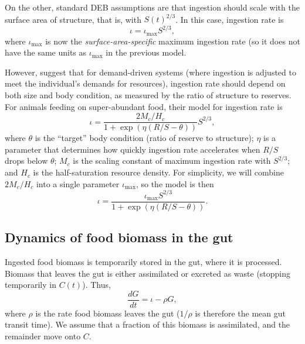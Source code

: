 \documentclass[11pt,reqno,final,pdftex]{amsart}\usepackage[]{graphicx}\usepackage[]{color}
\theoremstyle{plain}
\numberwithin{equation}{part}
\begin{document}
On the other, standard DEB assumptions are that ingestion should scale with the surface area of structure, that is, with $S(t)^{2/3}$.
In this case, ingestion rate is
\begin{equation}
\iota=\iota_{\max }S^{2/3},
\end{equation}
where $\iota_{\max}$ is now the \emph{surface-area-specific} maximum ingestion rate (so it does not have the same units as $\iota_{\max}$ in the previous model.

However, \citet{deRoos2013} suggest that for demand-driven systems (where ingestion is adjusted to meet the individual's demands for resources), ingestion rate should depend on both size and body condition, as measured by the ratio of structure to reserves.
For animals feeding on super-abundant food, their model for ingestion rate is
\begin{equation}
\iota = \frac{2M_c/H_c}{1 + \exp\left(\eta(R/S-\theta)\right)}S^{2/3},
\end{equation}
where $\theta$ is the ``target'' body condition (ratio of reserve to structure); $\eta$ is a parameter that determines how quickly ingestion rate accelerates when $R/S$ drops below $\theta$; $M_c$ is the scaling constant of maximum ingestion rate with $S^{2/3}$; and $H_c$ is the half-saturation resource density.
For simplicity, we will combine $2M_c/H_c$ into a single parameter $\iota_{\max}$, so the model is then
\begin{equation}
\iota = \frac{\iota_{\max}S^{2/3}}{1 + \exp\left(\eta(R/S-\theta)\right)}.
\end{equation}


\subsection*{Dynamics of food biomass in the gut}
Ingested food biomass is temporarily stored in the gut, where it is processed.
Biomass that leaves the gut is either assimilated or excreted as waste (stopping temporarily in $C(t)$).
Thus,
\begin{equation}
\frac{dG}{dt} = \iota - \rho G,
\end{equation}
where $\rho$ is the rate food biomass leaves the gut ($1/\rho$ is therefore the mean gut transit time).
We assume that a fraction of this biomass is assimilated, and the remainder move onto $C$.
\end{document}
